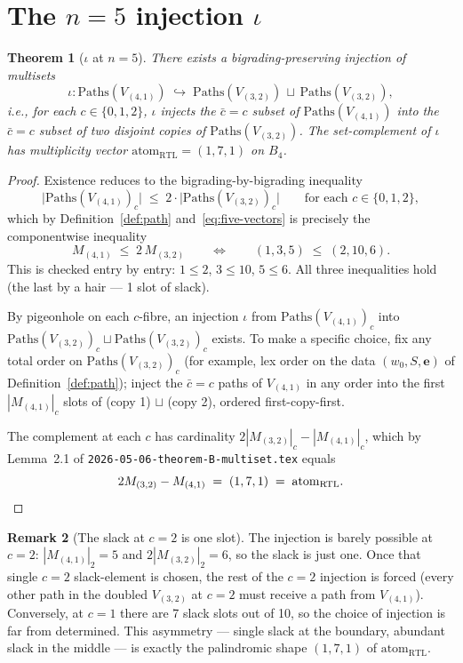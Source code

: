 \documentclass[11pt]{article}
\newtheorem{theorem}{Theorem}
\theoremstyle{definition}
\newtheorem{remark}[theorem]{Remark}
\begin{document}
\section{The $n=5$ injection $\iota$}\label{sec:n5}

\begin{theorem}[$\iota$ at $n=5$]\label{thm:n5}
There exists a bigrading-preserving injection of multisets
\[
\iota : \mathrm{Paths}(V_{(4,1)}) \;\hookrightarrow\; \mathrm{Paths}(V_{(3,2)}) \,\sqcup\, \mathrm{Paths}(V_{(3,2)}),
\]
i.e., for each $c \in \{0,1,2\}$, $\iota$ injects the $\bar c = c$ subset of $\mathrm{Paths}(V_{(4,1)})$ into the $\bar c = c$ subset of two disjoint copies of $\mathrm{Paths}(V_{(3,2)})$. The set-complement of $\iota$ has multiplicity vector $\mathrm{atom}_{\mathrm{RTL}} = (1,7,1)$ on $B_4$.
\end{theorem}

\begin{proof}
Existence reduces to the bigrading-by-bigrading inequality
\[
\bigl|\mathrm{Paths}(V_{(4,1)})_c\bigr| \;\leq\; 2 \cdot \bigl|\mathrm{Paths}(V_{(3,2)})_c\bigr| \qquad \text{for each } c \in \{0, 1, 2\},
\]
which by Definition~\ref{def:path} and~\eqref{eq:five-vectors} is precisely the componentwise inequality
\[
M_{(4,1)} \;\leq\; 2\, M_{(3,2)} \qquad \Longleftrightarrow \qquad (1, 3, 5) \;\leq\; (2, 10, 6).
\]
This is checked entry by entry: $1 \leq 2$, $3 \leq 10$, $5 \leq 6$. All three inequalities hold (the last by a hair --- 1 slot of slack).

By pigeonhole on each $c$-fibre, an injection $\iota$ from $\mathrm{Paths}(V_{(4,1)})_c$ into $\mathrm{Paths}(V_{(3,2)})_c \sqcup \mathrm{Paths}(V_{(3,2)})_c$ exists. To make a specific choice, fix any total order on $\mathrm{Paths}(V_{(3,2)})_c$ (for example, lex order on the data $(w_0, S, \mathbf{e})$ of Definition~\ref{def:path}); inject the $\bar c = c$ paths of $V_{(4,1)}$ in any order into the first $|M_{(4,1)}|_c$ slots of (copy 1) $\sqcup$ (copy 2), ordered first-copy-first.

The complement at each $c$ has cardinality $2 |M_{(3,2)}|_c - |M_{(4,1)}|_c$, which by Lemma~2.1 of \texttt{2026-05-06-theorem-B-multiset.tex} equals
\[
2 M_{(3,2)} - M_{(4,1)} \;=\; (1,7,1) \;=\; \mathrm{atom}_{\mathrm{RTL}}. \qedhere
\]
\end{proof}

\begin{remark}[The slack at $c=2$ is one slot]\label{rem:tight}
The injection is barely possible at $c = 2$: $|M_{(4,1)}|_2 = 5$ and $2 |M_{(3,2)}|_2 = 6$, so the slack is just one. Once that single $c=2$ slack-element is chosen, the rest of the $c=2$ injection is forced (every other path in the doubled $V_{(3,2)}$ at $c=2$ must receive a path from $V_{(4,1)}$). Conversely, at $c = 1$ there are 7 slack slots out of 10, so the choice of injection is far from determined. This asymmetry --- single slack at the boundary, abundant slack in the middle --- is exactly the palindromic shape $(1, 7, 1)$ of $\mathrm{atom}_{\mathrm{RTL}}$.
\end{remark}
\end{document}
